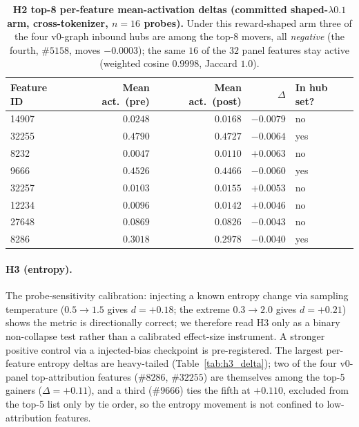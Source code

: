 \documentclass{article}
\begin{document}
\begin{table}[h]
\centering
\caption{\textbf{H2 top-8 per-feature mean-activation deltas (committed shaped-$\lambda0.1$ arm, cross-tokenizer, $n=16$ probes).} Under this reward-shaped arm three of the four v0-graph inbound hubs are among the top-8 movers, all \emph{negative} (the fourth, $\#5158$, moves $-0.0003$); the same $16$ of the $32$ panel features stay active (weighted cosine $0.9998$, Jaccard $1.0$).}
\label{tab:h2_delta}
\small
\begin{tabular}{lrrrl}
\toprule
Feature ID & Mean act.\ (pre) & Mean act.\ (post) & $\Delta$ & In hub set? \\
\midrule
14907 & $0.0248$ & $0.0168$ & $-0.0079$ & no \\
32255 & $0.4790$ & $0.4727$ & $-0.0064$ & yes \\
8232  & $0.0047$ & $0.0110$ & $+0.0063$ & no \\
9666  & $0.4526$ & $0.4466$ & $-0.0060$ & yes \\
32257 & $0.0103$ & $0.0155$ & $+0.0053$ & no \\
12234 & $0.0096$ & $0.0142$ & $+0.0046$ & no \\
27648 & $0.0869$ & $0.0826$ & $-0.0043$ & no \\
8286  & $0.3018$ & $0.2978$ & $-0.0040$ & yes \\
\bottomrule
\end{tabular}
\end{table}

\paragraph{H3 (entropy).} The probe-sensitivity calibration: injecting a known entropy change via sampling temperature ($0.5\to1.5$ gives $d=+0.18$; the extreme $0.3\to2.0$ gives $d=+0.21$) shows the metric is directionally correct; we therefore read H3 only as a binary non-collapse test rather than a calibrated effect-size instrument. A stronger positive control via a \citet{cherrl2026} injected-bias checkpoint is pre-registered. The largest per-feature entropy deltas are heavy-tailed (Table~\ref{tab:h3_delta}); two of the four v0-panel top-attribution features ($\#8286$, $\#32255$) are themselves among the top-5 gainers ($\Delta=+0.11$), and a third ($\#9666$) ties the fifth at $+0.110$, excluded from the top-5 list only by tie order, so the entropy movement is not confined to low-attribution features.
\end{document}
